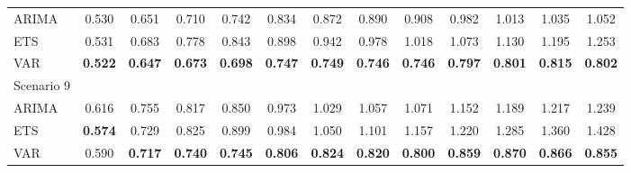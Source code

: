 \begin{table}[H]
{\begin{tabular}{lcccccccccccc}
\hline
ARIMA & 0.530 & 0.651 & 0.710 & 0.742 & 0.834 & 0.872 & 0.890 & 0.908 & 0.982 & 1.013 & 1.035 & 1.052\\
ETS & 0.531 & 0.683 & 0.778 & 0.843 & 0.898 & 0.942 & 0.978 & 1.018 & 1.073 & 1.130 & 1.195 & 1.253\\
VAR & \textbf{0.522} & \textbf{0.647} & \textbf{0.673} & \textbf{0.698} & \textbf{0.747} & \textbf{0.749} & \textbf{0.746} & \textbf{0.746} & \textbf{0.797} & \textbf{0.801} & \textbf{0.815} & \textbf{0.802}\\
\hline
Scenario 9 &  &  &  &  &  &  &  &  &  &  &  & \\
\hline
ARIMA & 0.616 & 0.755 & 0.817 & 0.850 & 0.973 & 1.029 & 1.057 & 1.071 & 1.152 & 1.189 & 1.217 & 1.239\\
ETS & \textbf{0.574} & 0.729 & 0.825 & 0.899 & 0.984 & 1.050 & 1.101 & 1.157 & 1.220 & 1.285 & 1.360 & 1.428\\
VAR & 0.590 & \textbf{0.717} & \textbf{0.740} & \textbf{0.745} & \textbf{0.806} & \textbf{0.824} & \textbf{0.820} & \textbf{0.800} & \textbf{0.859} & \textbf{0.870} & \textbf{0.866} & \textbf{0.855}\\
\hline
    \end{tabular}%
    }
    \label{tab:RMSSE}
\end{table}
